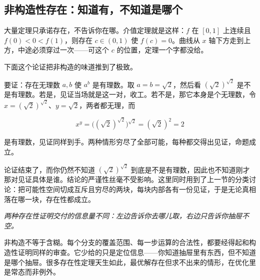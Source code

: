 \subsection{非构造性存在：知道有，不知道是哪个}

大量定理只承诺存在，不告诉你在哪。介值定理就是这样：\(f\) 在 \([0,1]\) 上连续且 \(f(0)<0<f(1)\)，则存在 \(c\in(0,1)\) 使 \(f(c)=0\)。曲线从 \(x\) 轴下方走到上方，中途必须穿过一次——可这个 \(c\) 的位置，定理一个字都没给。

下面这个论证把非构造的味道推到了极致。

要证：存在无理数 \(a,b\) 使 \(a^b\) 是有理数。取 \(a=b=\sqrt2\)，然后看 \((\sqrt2)^{\sqrt2}\) 是不是有理数。若是，见证当场就是这一对，收工。若不是，那它本身是个无理数，令 \(x=(\sqrt2)^{\sqrt2}\)、\(y=\sqrt2\)，两者都无理，而

\[
x^y=\bigl((\sqrt2)^{\sqrt2}\bigr)^{\sqrt2}=(\sqrt2)^2=2
\]

是有理数，见证同样到手。两种情形穷尽了全部可能，每种都交得出见证，命题成立。

论证结束了，而你仍然不知道 \((\sqrt2)^{\sqrt2}\) 到底是不是有理数，因此也不知道刚才那对见证具体是谁。结论的严谨性丝毫不受影响。这里同时用到了上一节的分类讨论：把可能性空间切成互斥且穷尽的两块，每块内部各有一份见证，于是无论真相落在哪一块，存在性都成立。

\begin{center}

\emph{两种存在性证明交付的信息量不同：左边告诉你去哪儿取，右边只告诉你抽屉不空。}
\end{center}

非构造不等于含糊。每个分支的覆盖范围、每一步运算的合法性，都要经得起和构造性证明同样的审查。它少给的只是定位信息——你知道抽屉里有东西，但不知道是哪个抽屉。很多存在性定理天生如此，最优解存在但求不出来的情形，在优化里是常态而非例外。

